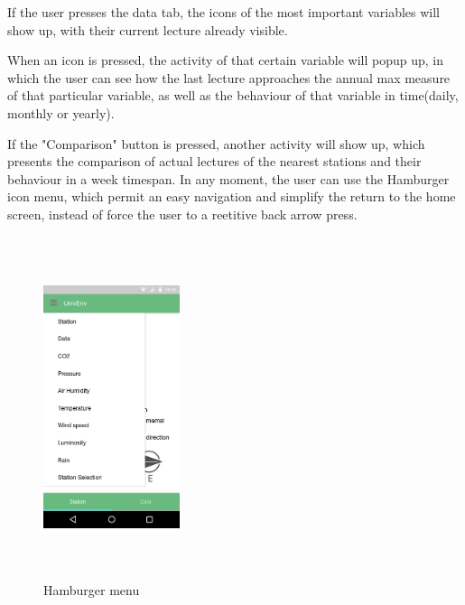 \documentclass[12pt]{article} %
\begin{document}
If the user presses the data tab, the icons of the most important variables will show up, with their current lecture already visible.

When an icon is pressed, the activity of that certain variable will popup up, in which the user can see how the last lecture approaches the annual max measure of that particular variable, as well as the behaviour of that variable in time(daily, monthly or yearly).

If the "Comparison" button is pressed, another activity will show up, which presents the comparison of actual lectures of the nearest stations and their behaviour in a week timespan.
In any moment, the user can use the Hamburger icon menu, which permit an easy navigation and simplify the return to the home screen, instead of force the user to a reetitive back arrow press.
  
\begin{figure}[H]
  \centering
  \includegraphics[width=4cm,height=10cm,keepaspectratio]{img/menu.png}  
  \caption{Hamburger menu}
  \label{fig:boat1}
\end{figure}
\end{document}
